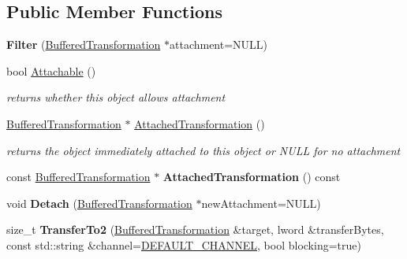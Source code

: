 \subsection*{Public Member Functions}
\begin{DoxyCompactItemize}
\item 
\hypertarget{class_filter_a3c1c355eb02ae048020785d335bad6b3}{
{\bfseries Filter} (\hyperlink{class_buffered_transformation}{BufferedTransformation} $\ast$attachment=NULL)}
\label{class_filter_a3c1c355eb02ae048020785d335bad6b3}

\item 
bool \hyperlink{class_filter_a6e7251247b5c2cc3b0c15e861cc88e16}{Attachable} ()
\begin{DoxyCompactList}\small\item\em returns whether this object allows attachment \item\end{DoxyCompactList}\item 
\hypertarget{class_filter_a4932e29c22a4f7bc3173d0e1a389e0d1}{
\hyperlink{class_buffered_transformation}{BufferedTransformation} $\ast$ \hyperlink{class_filter_a4932e29c22a4f7bc3173d0e1a389e0d1}{AttachedTransformation} ()}
\label{class_filter_a4932e29c22a4f7bc3173d0e1a389e0d1}

\begin{DoxyCompactList}\small\item\em returns the object immediately attached to this object or NULL for no attachment \item\end{DoxyCompactList}\item 
\hypertarget{class_filter_a03584542c5bb966cdb33df80f447916a}{
const \hyperlink{class_buffered_transformation}{BufferedTransformation} $\ast$ {\bfseries AttachedTransformation} () const }
\label{class_filter_a03584542c5bb966cdb33df80f447916a}

\item 
\hypertarget{class_filter_a93817876b45172108fe0342de6442f75}{
void {\bfseries Detach} (\hyperlink{class_buffered_transformation}{BufferedTransformation} $\ast$newAttachment=NULL)}
\label{class_filter_a93817876b45172108fe0342de6442f75}

\item 
\hypertarget{class_filter_ab24c6c52bb6185c25ee6efcced36dbd0}{
size\_\-t {\bfseries TransferTo2} (\hyperlink{class_buffered_transformation}{BufferedTransformation} \&target, lword \&transferBytes, const std::string \&channel=\hyperlink{cryptlib_8h_a6f1917f54ea8c2a45de6e08c5087c8de}{DEFAULT\_\-CHANNEL}, bool blocking=true)}
\label{class_filter_ab24c6c52bb6185c25ee6efcced36dbd0}


\end{DoxyCompactItemize}
